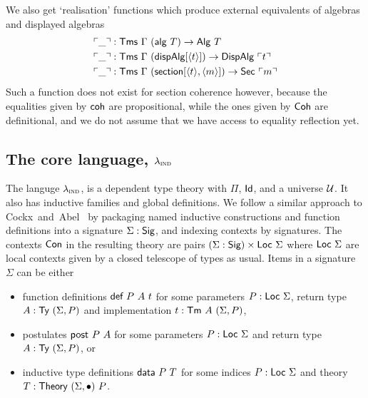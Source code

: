 We also get `realisation' functions which produce external equivalents of algebras
and displayed algebras
\begin{align*}
    &\ulcorner \_ \urcorner : \textsf{Tms}\ \Gamma\ (\textsf{alg}\ T) \to \textsf{Alg}\ T \\
    &\ulcorner \_ \urcorner : \textsf{Tms}\ \Gamma\ (\textsf{dispAlg}[\langle t\rangle]) \to \textsf{DispAlg}\ \ulcorner t \urcorner \\
    &\ulcorner \_ \urcorner : \textsf{Tms}\ \Gamma\ (\textsf{section}[\langle t\rangle,\langle m\rangle]) \to \textsf{Sec}\ \ulcorner m \urcorner
\end{align*}
Such a function does not exist for section coherence however, because the
equalities given by $\textsf{coh}$ are propositional, while the ones given by
$\textsf{Coh}$ are definitional, and we do not assume that we have access to
equality reflection yet.



\subsection{The core language, $\lambda_{\textsc{ind}}$}

The languge $\lambda_{\textsc{ind}}$, is a dependent type theory with $\Pi$, $\textsf{Id}$, and
a universe $\mathcal{U}$.
It also has inductive families and global definitions. We follow a similar
approach to Cockx~and~Abel~\cite{Cockx2018-fk} by packaging named inductive
constructions and function definitions into a signature $\Sigma : \textsf{Sig}$, and
indexing contexts by signatures. The contexts $\textsf{Con}$ in the resulting theory are
pairs $(\Sigma : \textsf{Sig}) \times \textsf{Loc}\ \Sigma$ where $\Loc\ \Sigma$ are local
contexts given by a closed telescope of types as usual. Items in a signature
$\Sigma$ can be either

\begin{itemize}
	\item function definitions $\mta{def}\ P\ A\ t$ for some parameters $P : \textsf{Loc}\
		      \Sigma$, return type $A : \textsf{Ty}\ (\Sigma, P)$ and implementation $t : \textsf{Tm}\ A\ (\Sigma, P)$,
	\item postulates $\textsf{post}\ P\ A$ for some parameters $P : \textsf{Loc}\
		      \Sigma$ and return type $A : \textsf{Ty}\ (\Sigma, P)$, or
	\item inductive type definitions $\mta{data}\ P\ T$ for some indices $P :
		      \textsf{Loc}\ \Sigma$ and theory $T : \textsf{Theory}\ (\Sigma, \bullet)\ P$.
\end{itemize}


